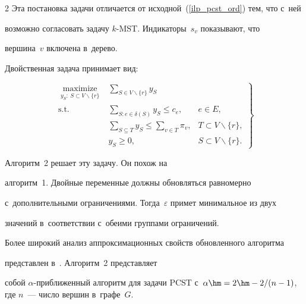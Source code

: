 \begin{multicols}{2}
Эта постановка задачи отличается от исходной~(\ref{ilp_pcst_ord}) тем, что с~ней 

возможно согласовать задачу $k$-MST. Индикаторы~$s_v$ показывают, что 

вершина~$v$ включена в~дерево.



Двойственная задача принимает вид:

\begin{equation}

\left.

\begin{array}{rll}

\underset{\substack{y_S:~S\subset V\backslash\{r\}}}{\mbox{maximize}} & 

\displaystyle \sum\limits_{S\in V\backslash\{r\}}y_S &\\[6pt]

\mbox{s.t.} & \displaystyle \sum\limits_{S:e\in\delta(S)}y_S\leqslant c_e , & e\in 

E,\\[6pt]

& \displaystyle \sum\limits_{S\subseteq T}y_S\leqslant \sum\limits_{v\in T}\pi_v, & T\subset 

V\backslash\{r\},\\[6pt]

& y_S\geqslant 0, & S\subset V\backslash\{r\}.

\end{array}

\right\}

\label{rd_pcst_inord}

\end{equation}



Алгоритм~2 решает эту задачу. Он похож на 

алгоритм~1. Двойные переменные должны обновляться равномерно 

с~дополнительными ограничениями. Тогда~$\varepsilon$ примет минимальное из двух 

значений в~соответствии с~обеими группами ограничений.

Более широкий анализ аппроксимационных свойств обновленного алгоритма 

представлен в~\cite{goemans1995general}. Алгоритм~2 представляет 

собой $\alpha$-приближенный алгоритм для задачи PCST с~$\alpha \hm= 2 \hm- 

{2}/({n-1})$, где $n$~--- число вершин в~графе~$G$.




\end{multicols}
